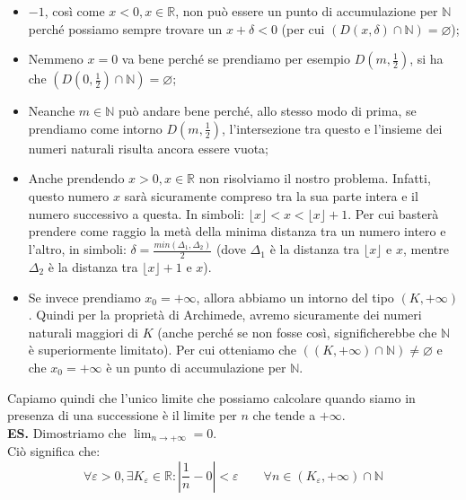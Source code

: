 \documentclass{article}
\begin{document}
\begin{itemize}
    \item $-1$, così come $x < 0, x \in \mathbb{R}$, non può essere un punto di accumulazione per $\mathbb{N}$ perché possiamo sempre trovare un $x +\delta < 0$ (per cui $(D(x, \delta) \cap \mathbb{N}) = \varnothing$);
    \item Nemmeno $x = 0$ va bene perché se prendiamo per esempio $D(m, \frac{1}{2})$, si ha che $(D(0, \frac{1}{2}) \cap \mathbb{N}) = \varnothing$;
    \item Neanche $m \in \mathbb{N}$ può andare bene perché, allo stesso modo di prima, se prendiamo come intorno $D(m, \frac{1}{2})$, l'intersezione tra questo e l'insieme dei numeri naturali risulta ancora essere vuota;
    \item Anche prendendo $x > 0, x \in \mathbb{R}$ non risolviamo il nostro problema. Infatti, questo numero $x$ sarà sicuramente compreso tra la sua parte intera e il numero successivo a questa. In simboli: $\lfloor x \rfloor < x < \lfloor x \rfloor + 1$. Per cui basterà prendere come raggio la metà della minima distanza tra un numero intero e l'altro, in simboli: $\delta = \frac{min(\Delta_1, \Delta_2)}{2}$ (dove $\Delta_1$ è la distanza tra $\lfloor x \rfloor$ e $x$, mentre $\Delta_2$ è la distanza tra $\lfloor x \rfloor + 1$ e $x$).
    \item Se invece prendiamo $x_0 = +\infty$, allora abbiamo un intorno del tipo $(K, +\infty)$. Quindi per la proprietà di Archimede, avremo sicuramente dei numeri naturali maggiori di $K$ (anche perché se non fosse così, significherebbe che $\mathbb{N}$ è superiormente limitato). Per cui otteniamo che $((K, + \infty) \cap \mathbb{N}) \neq \varnothing$ e che $x_0 = +\infty$ è un punto di accumulazione per $\mathbb{N}$.
\end{itemize}

\noindent Capiamo quindi che l'unico limite che possiamo calcolare quando siamo in presenza di una successione è il limite per $n$ che tende a $+\infty$.\\

\noindent\textbf{ES.} Dimostriamo che $\lim_{n \to +\infty} = 0$.\\
Ciò significa che:
\begin{equation*}
    \forall \varepsilon > 0, \exists K_\varepsilon \in \mathbb{R} : \left|\frac{1}{n} - 0\right| < \varepsilon \qquad \forall n \in (K_\varepsilon, +\infty) \cap \mathbb{N}
\end{equation*}
\end{document}
